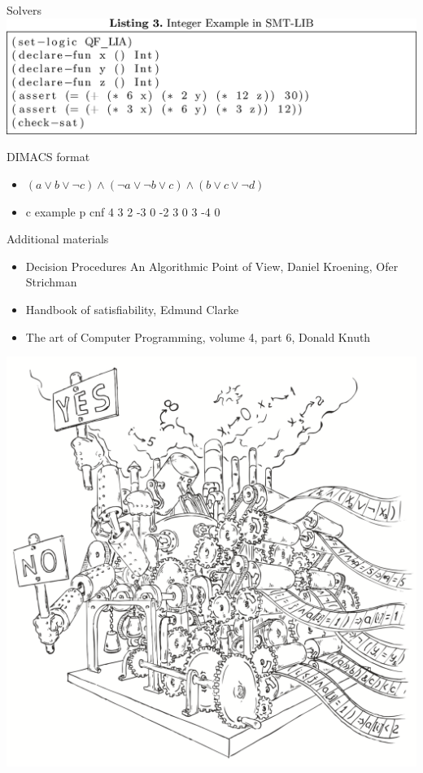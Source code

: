 \documentclass[mathserif]{beamer}
\begin{document}
\begin{frame}{Solvers}
\includegraphics[scale=1.0]{SMT-LIB.png}
\end{frame}

\begin{frame}{DIMACS format}
\begin{itemize}
\item $(a \vee b \vee \lnot c) \wedge (\lnot a \vee \lnot b \vee c) \wedge (b \vee c \vee \lnot d)$
\item c example\newline
p cnf 4 3 2 -3 0 -2 3 0 3 -4 0\newline
\end{itemize}
\end{frame}

\begin{frame}{Additional materials}
\begin{itemize}
\item Decision Procedures An Algorithmic Point of View, Daniel Kroening, Ofer Strichman
\item Handbook of satisfiability, Edmund Clarke
\item The art of Computer Programming, volume 4, part 6, Donald Knuth
\end{itemize}
\end{frame}

\begin{frame}
\includegraphics[scale=0.5]{../decision-procedure.png}
\end{frame}
\end{document}
